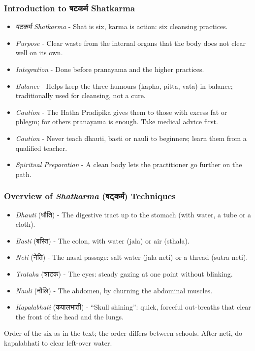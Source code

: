 \begin{frame}[fragile]\frametitle{Introduction to षटकर्म Shatkarma}

  \begin{itemize}
	\item \textit{षटकर्म Shatkarma} - Shat is six, karma is action: six cleansing practices.
	\item \textit{Purpose} - Clear waste from the internal organs that the body does not clear well on its own.
	\item \textit{Integration} - Done before pranayama and the higher practices.
	\item \textit{Balance} - Helps keep the three humours (kapha, pitta, vata) in balance; traditionally used for cleansing, not a cure.
	\item \textit{Caution} - The Hatha Pradipika gives them to those with excess fat or phlegm; for others pranayama is enough. Take medical advice first.
	\item \textit{Caution} - Never teach dhauti, basti or nauli to beginners; learn them from a qualified teacher.
	\item \textit{Spiritual Preparation} - A clean body lets the practitioner go further on the path.
  \end{itemize}

\end{frame}

\begin{frame}[fragile]\frametitle{Overview of \textit{Shatkarma} (षट्कर्म) Techniques}

      \begin{itemize}
        \item \textit{Dhauti} (धौति) - The digestive tract up to the stomach (with water, a tube or a cloth).
        \item \textit{Basti} (बस्ति) - The colon, with water (jala) or air (sthala).
        \item \textit{Neti} (नेति) - The nasal passage: salt water (jala neti) or a thread (sutra neti).
        \item \textit{Trataka} (त्राटक) - The eyes: steady gazing at one point without blinking.
        \item \textit{Nauli} (नौलि) - The abdomen, by churning the abdominal muscles.
        \item \textit{Kapalabhati} (कपालभाती) - ``Skull shining'': quick, forceful out-breaths that clear the front of the head and the lungs.
      \end{itemize}
      {\small Order of the six as in the text; the order differs between schools. After neti, do kapalabhati to clear left-over water.}

\end{frame}



